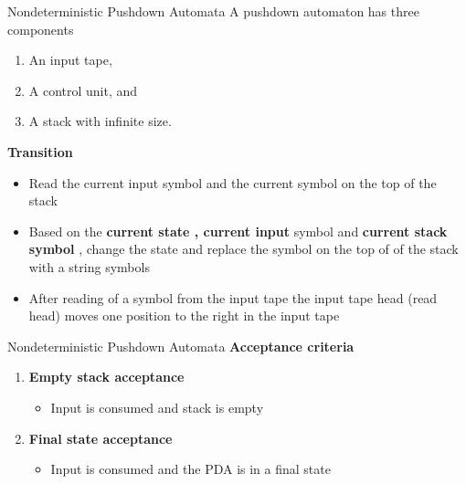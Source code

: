 \documentclass{beamer}
\begin{document}
\begin{frame}{Nondeterministic Pushdown Automata}
	A pushdown automaton has three components
\begin{enumerate}
	\item An input tape,
		\item A control unit, and
	\item	A stack with infinite size.
\end{enumerate}
\textbf{Transition}
\begin{itemize}
	\item Read the current input symbol and the current symbol on the top of the stack
	\item Based on the \textbf{current state , current input} symbol and \textbf{current stack symbol} , change the state and replace the symbol on the top of of the stack with a string symbols
	\item After reading of a symbol from the input tape  the input tape head (read head) moves one position to the right in the input tape
\end{itemize}
\end{frame}	
\begin{frame}{Nondeterministic Pushdown Automata}
\textbf{Acceptance criteria}
\begin{enumerate}
	\item \textbf{Empty stack acceptance}
	\begin{itemize}
		\item Input is consumed and stack is empty
	\end{itemize}
	\item \textbf{Final state acceptance}
	\begin{itemize}
		\item Input is consumed and the PDA is in a final state
	\end{itemize}
\end{enumerate}
\end{frame}	
\end{document}
